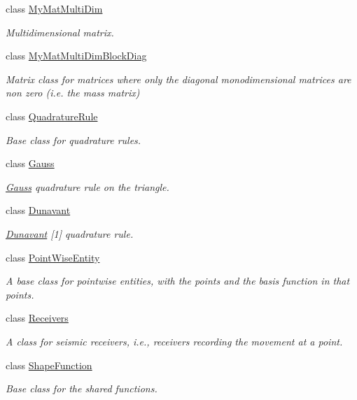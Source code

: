 \begin{DoxyCompactItemize}
class \hyperlink{classTspeed_1_1MyMatMultiDim}{My\-Mat\-Multi\-Dim}
\begin{DoxyCompactList}\small\item\em Multidimensional matrix. \end{DoxyCompactList}\item 
class \hyperlink{classTspeed_1_1MyMatMultiDimBlockDiag}{My\-Mat\-Multi\-Dim\-Block\-Diag}
\begin{DoxyCompactList}\small\item\em Matrix class for matrices where only the diagonal monodimensional matrices are non zero (i.\-e. the mass matrix) \end{DoxyCompactList}\item 
class \hyperlink{classTspeed_1_1QuadratureRule}{Quadrature\-Rule}
\begin{DoxyCompactList}\small\item\em Base class for quadrature rules. \end{DoxyCompactList}\item 
class \hyperlink{classTspeed_1_1Gauss}{Gauss}
\begin{DoxyCompactList}\small\item\em \hyperlink{classTspeed_1_1Gauss}{Gauss} quadrature rule on the triangle. \end{DoxyCompactList}\item 
class \hyperlink{classTspeed_1_1Dunavant}{Dunavant}
\begin{DoxyCompactList}\small\item\em \hyperlink{classTspeed_1_1Dunavant}{Dunavant} \mbox{[}1\mbox{]} quadrature rule. \end{DoxyCompactList}\item 
class \hyperlink{classTspeed_1_1PointWiseEntity}{Point\-Wise\-Entity}
\begin{DoxyCompactList}\small\item\em A base class for pointwise entities, with the points and the basis function in that points. \end{DoxyCompactList}\item 
class \hyperlink{classTspeed_1_1Receivers}{Receivers}
\begin{DoxyCompactList}\small\item\em A class for seismic receivers, i.\-e., receivers recording the movement at a point. \end{DoxyCompactList}\item 
class \hyperlink{classTspeed_1_1ShapeFunction}{Shape\-Function}
\begin{DoxyCompactList}\small\item\em Base class for the shared functions. \end{DoxyCompactList}\item 

\end{DoxyCompactItemize}
